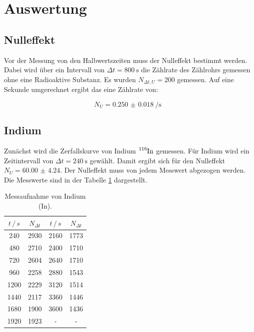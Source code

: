 \section{Auswertung}

\subsection{Nulleffekt}

Vor der Messung von den Halbwertszeiten muss der Nulleffekt bestimmt werden. Dabei
wird über ein Intervall von $\Delta t = \SI{800}{\second}$ die Zählrate des Zählrohrs
gemessen ohne eine Radioaktive Substanz. Es wurden $N_{\Delta t , U} = 200$ gemessen.
Auf eine Sekunde umgerechnet ergibt das eine Zählrate von:

\begin{equation*}
  N_U = \SI{0.250(18)}{\per\second}
\end{equation*}

\subsection{Indium}

Zunächst wird die Zerfallskurve von Indium $\ce{^{116}In}$ gemessen. Für Indium wird ein Zeitintervall
von $\Delta t = \SI{240}{\second}$ gewählt. Damit ergibt sich für den Nulleffekt
$N_U = \num{60.00(424)}$. Der Nulleffekt muss von jedem Messwert abgezogen werden.
Die Messwerte sind in der Tabelle \ref{tab:1} dargestellt.

\begin{table}[H]
  \centering
  \caption{Messaufnahme von Indium (In).}
  \label{tab:1}
  \begin{tabular}{c c c c}
    \toprule
    $t \, /\, s$& $N_{\Delta t}$& $t \, /\, s$& $N_{\Delta t}$ \\
    \midrule
    240  &  2930 & 2160 & 1773\\
    480  &  2710 & 2400 & 1710\\
    720  &  2604 & 2640 & 1710\\
    960  &  2258 & 2880 & 1543\\
    1200 &  2229 & 3120 & 1514\\
    1440 &  2117 & 3360 & 1446\\
    1680 &  1900 & 3600 & 1436\\
    1920 &  1923 & - & -\\
    \bottomrule
  \end{tabular}
\end{table}

